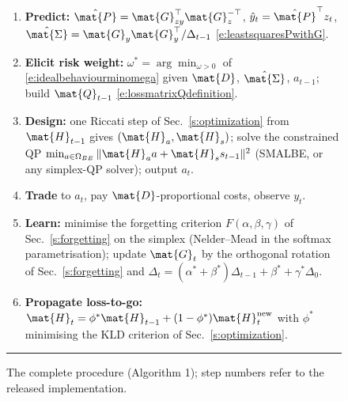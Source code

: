 \begin{figure}[ht!]
\begin{minipage}{\columnwidth}
\begin{enumerate}
\item \textbf{Predict:} $\hat{\mat{P}}=\mat{G}_{zy}^\top\mat{G}_{z}^{-\top}$, $\hat y_t=\hat{\mat{P}}^\top z_t$, $\hat{\mat{\Sigma}}=\mat{G}_y\mat{G}_y^\top/\Delta_{t-1}$ \eqref{e:leastsquaresPwithG}.
\item \textbf{Elicit risk weight:} $\omega^*=\arg\min_{\omega>0}$ of \eqref{e:idealbehaviourminomega} given $\mat{D}$, $\hat{\mat{\Sigma}}$, $a_{t-1}$; build $\mat{Q}_{t-1}$ \eqref{e:lossmatrixQdefinition}.
\item \textbf{Design:} one Riccati step of Sec.~\ref{s:optimization} from $\mat{H}_{t-1}$ gives $(\mat{H}_a,\mat{H}_s)$; solve the constrained QP $\min_{a\in\Omega_{BE}}\|\mat{H}_a a+\mat{H}_s s_{t-1}\|^2$ (SMALBE, or any simplex-QP solver); output $a_t$.
\item \textbf{Trade} to $a_t$, pay $\mat{D}$-proportional costs, observe $y_t$.
\item \textbf{Learn:} minimise the forgetting criterion $F(\alpha,\beta,\gamma)$ of Sec.~\ref{s:forgetting} on the simplex (Nelder--Mead in the softmax parametrisation); update $\mat{G}_t$ by the orthogonal rotation of Sec.~\ref{s:forgetting} and $\Delta_t=(\alpha^*+\beta^*)\Delta_{t-1}+\beta^*+\gamma^*\Delta_0$.
\item \textbf{Propagate loss-to-go:} $\mat{H}_t=\phi^*\mat{H}_{t-1}+(1-\phi^*)\mat{H}_t^{\rm new}$ with $\phi^*$ minimising the KLD criterion of Sec.~\ref{s:optimization}.
\end{enumerate}
\noindent\rule{\linewidth}{0.6pt}
\end{minipage}
\caption{The complete procedure (Algorithm 1); step numbers refer to the released implementation.}
\label{alg:pipeline}
\end{figure}

